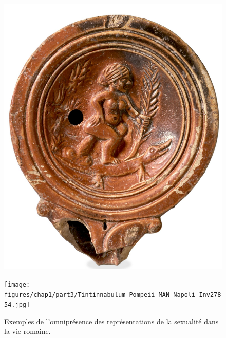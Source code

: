 {\begin{figure}
\begin{minipage}{0.45\linewidth}
        \includegraphics[width=\linewidth]{figures/chap1/part3/36916001.jpg}
        \caption{Lampe en terracota figurant une scène soit d'agalmatophilie avec un Priape, soit de masturbation avec un godemichet. Le personnage est une naine noire égyptienne, caractéristique d'une tendance artistique du I\textsuperscript{er} siècle de notre ère. Entre 50 et 75 d'après Paul G.~P.~Meyboom et M.~J.~Versluys\footcite{meyboom2006meaning}. \textcopyright British Museum, CC-BY-SA-NC.}
    \end{minipage}%
    \hfill
    \begin{minipage}{0.45\linewidth}%
        \centering
        \texttt{[image: figures/chap1/part3/Tintinnabulum\_Pompeii\_MAN\_Napoli\_Inv27854.jpg]}
        \caption{\textit{Tintinnabulum} représentant un Mercure ityphallique. Il manque les clochettes. Museo Archeologico Nazionale di Napoli (inv. 27854).  \textcopyright Marie-Lan Nguyen / Wikimedia Commons / CC-BY 2.5}
    \end{minipage}%
    \caption{Exemples de l'omniprésence des représentations de la sexualité dans la vie romaine.}
    \label{fig:chap1:planche1}
\end{figure}
\clearpage
}

